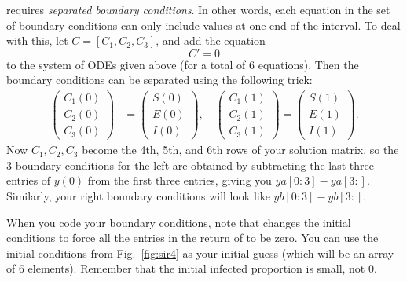  requires \emph{separated boundary conditions}.
In other words, each equation in the set of boundary conditions can only include values at one end of the interval.
To deal with this, let $C = [C_1, C_2, C_3]$, and add the equation
\[C' = 0\]
to the system of ODEs given above (for a total of 6 equations).
Then the boundary conditions can be separated using the following trick:
\begin{align*}
	\begin{pmatrix}C_1(0) \\C_2(0) \\ C_3(0) \end{pmatrix} &= \begin{pmatrix}S(0) \\E(0) \\ I(0) \end{pmatrix}, \quad 	\begin{pmatrix}C_1(1) \\C_2(1) \\ C_3(1) \end{pmatrix} = \begin{pmatrix}S(1) \\E(1) \\ I(1) \end{pmatrix}.
\end{align*}
Now $C_1,C_2,C_3$ become the 4th, 5th, and 6th rows of your solution matrix, so the 3 boundary conditions for the left are obtained by subtracting the last three entries of $y(0)$ from the first three entries, giving you $ya[0:3]-ya[3:]$. Similarly, your right boundary conditions will look like $yb[0:3]-yb[3:]$.

When you code your boundary conditions, note that  changes the initial conditions to force all the entries in the return of  to be zero.
You can use the initial conditions from Fig.~\ref{fig:sir4} as your initial guess (which will be an array of 6 elements). Remember that the initial infected proportion is small, not 0.

\label{prob:sir_measles}

